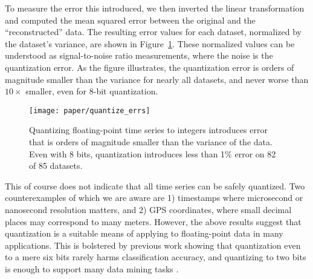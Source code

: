 To measure the error this introduced, we then inverted the linear transformation and computed the mean squared error between the original and the ``reconstructed'' data. The resulting error values for each dataset, normalized by the dataset's variance, are shown in Figure~\ref{fig:quantize_errs}. These normalized values can be understood as signal-to-noise ratio measurements, where the noise is the quantization error. As the figure illustrates, the quantization error is orders of magnitude smaller than the variance for nearly all datasets, and never worse than $10\times$ smaller, even for 8-bit quantization.

\begin{figure}[h]
\begin{center}
    \texttt{[image: paper/quantize\_errs]}
    \caption{Quantizing floating-point time series to integers introduces error that is orders of magnitude smaller than the variance of the data. Even with 8 bits, quantization introduces less than 1\% error on 82 of 85 datasets.}
    \label{fig:quantize_errs}
\end{center}
\end{figure}

This of course does not indicate that all time series can be safely quantized. Two counterexamples of which we are aware are 1) timestamps where microsecond or nanosecond resolution matters, and 2) GPS coordinates, where small decimal places may correspond to many meters. However, the above results suggest that quantization is a suitable means of applying \minesp to floating-point data in many applications. This is bolstered by previous work showing that quantization even to a mere six bits \cite{epenthesis} rarely harms classification accuracy, and quantizing to two bits is enough to support many data mining tasks \cite{sax, hotSax, isax, saxvsm}.



